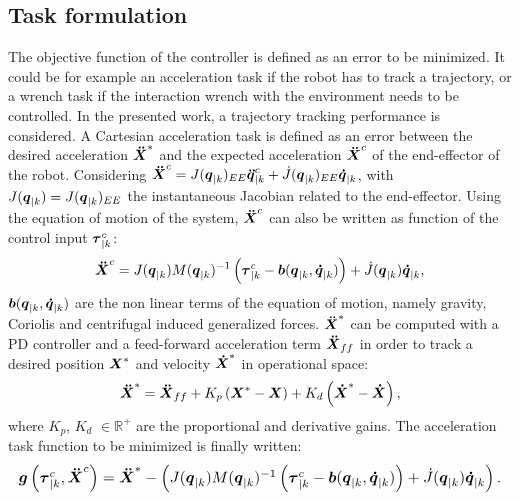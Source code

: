 \documentclass[letterpaper, 10 pt, conference]{ieeeconf}      %
\newcommand{\vect}[1]{\mbox{\boldmath${#1}$}}%
\begin{document}
\subsection{Task formulation}
The objective function of the controller is defined as an error to be minimized. It could be for example an acceleration task if the
robot has to track a trajectory, or a wrench task if the interaction wrench with the environment needs to be controlled. In the presented work, a trajectory tracking performance is considered. A Cartesian acceleration task is defined as an error between the desired acceleration $\vect{\ddot{X}}^{*}$ and the expected acceleration $\vect{\ddot{X}}^{c}$ of the end-effector of the robot. Considering $\vect{\ddot{X}}^{c} =  J(\vect{q}_{|k})_{EE} \vect{\ddot{q}}_{|k}^{c} + \dot{J}(\vect{q}_{|k})_{EE} \vect{\dot{q}}_{|k}$, with $J(\vect{q}_{|k})=J(\vect{q}_{|k})_{EE}$ the instantaneous Jacobian related to the end-effector. Using the equation of motion of the system, $\vect{\ddot{X}}^{c}$ can also be written as function of the control input $\vect{\tau}_{|k}^{c}$:
\begin{equation}
\vect{\ddot{X}}^{c} = J(\vect{q}_{|k}) M(\vect{q}_{|k})^{-1} \left(\vect{\tau}_{|k}^{c} - \vect{b}(\vect{q}_{|k},\vect{\dot{q}}_{|k})\right) + \dot{J}(\vect{q}_{|k}) \vect{\dot{q}}_{|k},
\label{Xddot}
\end{equation}
$\vect{b}(\vect{q}_{|k},\vect{\dot{q}}_{|k})$ are the non linear terms of the equation of motion, namely gravity, Coriolis and centrifugal induced generalized forces. $\vect{\ddot{X}}^{*}$ can be computed with a PD controller and a feed-forward acceleration term $\vect{\ddot{X}}_{ff}$ in order to track a desired position $\vect{X}^*$ and velocity $\vect{\dot{X}}^*$ in operational space:
\begin{equation}
\vect{\ddot{X}}^{*} = \vect{\ddot{X}}_{ff} + K_p\left(\vect{X}^{*}-\vect{X}\right) + K_d\left(\vect{\dot{X}}^{*}-\vect{\dot{X}}\right),
\label{accelerationError}
\end{equation}
where $K_p$, $K_d$ $\in \mathbb{R}^{+}$ are the proportional and derivative gains. The acceleration task function to be minimized is finally written:
\begin{equation}
\resizebox{1\hsize}{!}{$
\vect{g}\left(\vect{\tau}_{|k}^c,\vect{\ddot{X}}^c\right) =  \vect{\ddot{X}}^* - \left(J(\vect{q}_{|k}) M(\vect{q}_{|k})^{-1} \left(\vect{\tau}_{|k}^{c} - \vect{b}(\vect{q}_{|k},\vect{\dot{q}}_{|k}) \right) + \dot{J}(\vect{q}_{|k}) \vect{\dot{q}}_{|k}\right).$}
\label{accelerationError}
\end{equation}
\end{document}
